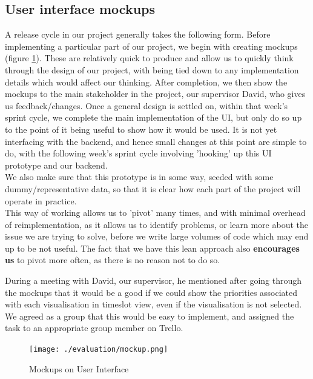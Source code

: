 \documentclass[a4paper]{article}
\begin{document}
\subsection{User interface mockups}
A release cycle in our project generally takes the following form. Before implementing a particular part of our project, we begin with creating mockups (figure \ref{fig:mockup}). These are relatively quick to produce and allow us to quickly think through the design of our project, with being tied down to any implementation details which would affect our thinking. After completion, we then show the mockups to the main stakeholder in the project, our supervisor David, who gives us feedback/changes. Once a general design is settled on, within that week's sprint cycle, we complete the main implementation of the UI, but only do so up to the point of it being useful to show how it would be used. It is not yet interfacing with the backend, and hence small changes at this point are simple to do, with the following week's sprint cycle involving 'hooking' up this UI prototype and our backend.\\

We also make sure that this prototype is in some way, seeded with some dummy/representative data, so that it is clear how each part of the project will operate in practice.\\

This way of working allows us to 'pivot' many times, and with minimal overhead of reimplementation, as it allows us to identify problems, or learn more about the issue we are trying to solve, before we write large volumes of code which may end up to be not useful. The fact that we have this lean approach also \textbf{encourages us} to pivot more often, as there is no reason not to do so.

During a meeting with David, our supervisor, he mentioned after going 
through the mockups that it would be a good if we could show the priorities
associated with each visualisation in timeslot view, even if the visualisation
is not selected.
We agreed as a group that this would be easy to implement, and assigned the 
task to an appropriate group member on Trello.

\begin{figure}[H]
   \begin{center}
      \texttt{[image: ./evaluation/mockup.png]}
   \end{center}
   \caption{Mockups on User Interface}
   \label{fig:mockup}
\end{figure}
\end{document}

